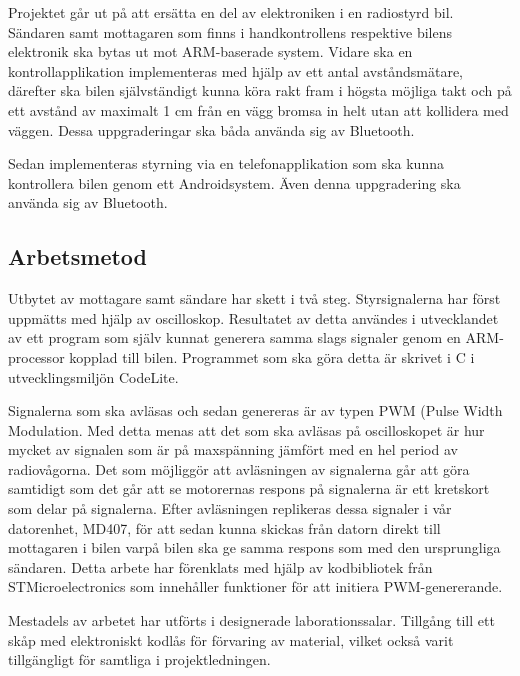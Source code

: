 \documentclass[a4paper]{article}
\begin{document}
Projektet går ut på att ersätta en del av elektroniken i en radiostyrd bil. Sändaren samt mottagaren som finns i handkontrollens respektive bilens elektronik ska bytas ut mot ARM-baserade system. Vidare ska en kontrollapplikation implementeras med hjälp av ett antal avståndsmätare, därefter ska bilen självständigt kunna köra rakt fram i högsta möjliga takt och på ett avstånd av maximalt 1 cm från en vägg bromsa in helt utan att kollidera med väggen. Dessa uppgraderingar ska båda använda sig av Bluetooth. 

\vspace{5mm}
Sedan implementeras styrning via en telefonapplikation som ska kunna kontrollera bilen genom ett Androidsystem. Även denna uppgradering ska använda sig av Bluetooth.

\subsection{Arbetsmetod}

Utbytet av mottagare samt sändare har skett i två steg. Styrsignalerna har först uppmätts med hjälp av oscilloskop. Resultatet av detta användes i utvecklandet av ett program som själv kunnat generera samma slags signaler genom en ARM-processor kopplad till bilen. Programmet som ska göra detta är skrivet i C i utvecklingsmiljön CodeLite.

\vspace{5mm}
Signalerna som ska avläsas och sedan genereras är av typen PWM (Pulse Width Modulation. Med detta menas att det som ska avläsas på oscilloskopet är hur mycket av signalen som är på maxspänning jämfört med en hel period av radiovågorna. Det som möjliggör att avläsningen av signalerna går att göra samtidigt som det går att se motorernas respons på signalerna är ett kretskort som delar på signalerna. Efter avläsningen replikeras dessa signaler i vår datorenhet, MD407, för att sedan kunna skickas från datorn direkt till mottagaren i bilen varpå bilen ska ge samma respons som med den ursprungliga sändaren. Detta arbete har förenklats med hjälp av kodbibliotek från STMicroelectronics som innehåller funktioner för att initiera PWM-genererande. 

\vspace{5mm}
Mestadels av arbetet har utförts i designerade laborationssalar. Tillgång till ett skåp med elektroniskt kodlås för förvaring av material, vilket också varit tillgängligt för samtliga i projektledningen.
\end{document}
